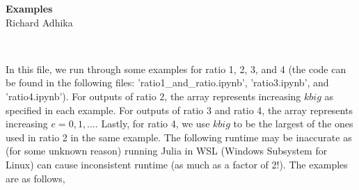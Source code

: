\documentclass[letterpaper,12pt]{article}
\begin{document}

\begin{center}
    {\Huge \textbf{Examples}} \\
    Richard Adhika
\end{center}

\

In this file, we run through some examples 
for ratio 1, 2, 3, and 4 (the code can be found in the following files:
'ratio1\_and\_ratio.ipynb', 'ratio3.ipynb', and 'ratio4.ipynb'). 
For outputs of ratio 2, the array represents increasing $kbig$ as specified in each example.
For outputs of ratio 3 and ratio 4, the array represents increasing $e = 0, 1, \dots$.
Lastly, for ratio 4, we use $kbig$ to be the largest of the ones used in ratio 2 in the same example. 
The following runtime may be inaccurate as (for some unknown reason)
running Julia in WSL (Windows Subsystem for Linux) can cause inconsistent runtime 
(as much as a factor of 2!).
The examples are as follows,
\end{document}
